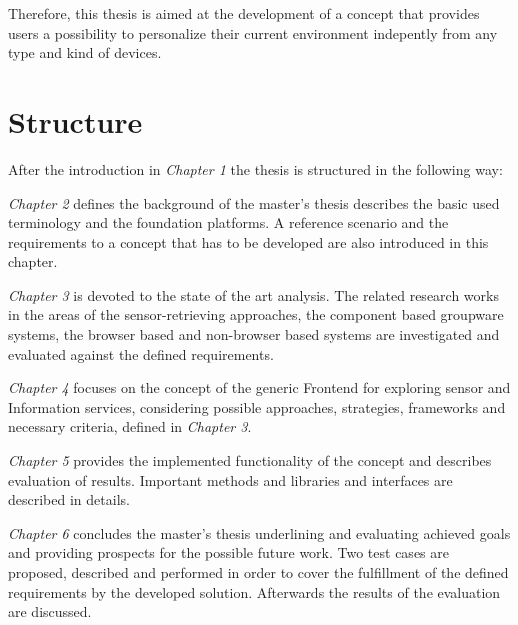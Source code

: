      Therefore, this thesis is aimed at the development of a concept that provides users a possibility to personalize their current environment indepently from any type and kind of devices.

\section{Structure}

After the introduction in \emph{Chapter 1} the thesis is structured in the following way:

\emph{Chapter 2} defines the background of the master’s thesis describes the basic used terminology and the foundation platforms. A reference scenario and the requirements to a concept that has to be developed are also introduced in this chapter.

\emph{Chapter 3} is devoted to the state of the art analysis. The related research works in the areas of the sensor-retrieving approaches, the component based groupware systems, the browser based and non-browser based systems are investigated and evaluated against the defined requirements.

\emph{Chapter 4} focuses on the concept of the generic Frontend for exploring sensor and Information services, considering possible approaches, strategies, frameworks and necessary criteria, defined in \emph{Chapter 3}.

\emph{Chapter 5} provides the implemented functionality of the concept and describes evaluation of results. Important methods and libraries and interfaces are described in details.

\emph{Chapter 6} concludes the master’s thesis underlining and evaluating achieved goals and providing prospects for the possible future work. Two test cases are proposed, described and performed in order to cover the fulfillment of the defined requirements by the developed solution. Afterwards the results of the evaluation are discussed.
